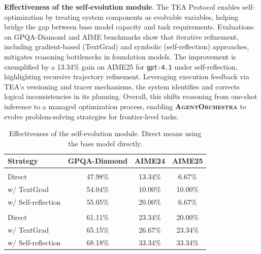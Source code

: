 \documentclass[11pt]{article}
\newcommand{\projectname}{\textbf{\textsc{AgentOrchestra}}\xspace}
\begin{document}
\textbf{Effectiveness of the self-evolution module}. The TEA Protocol enables self-optimization by treating system components as evolvable variables, helping bridge the gap between base model capacity and task requirements. Evaluations on GPQA-Diamond and AIME benchmarks show that iterative refinement, including gradient-based (TextGrad) and symbolic (self-reflection) approaches, mitigates reasoning bottlenecks in foundation models. The improvement is exemplified by a 13.34\% gain on AIME25 for \texttt{gpt-4.1} under self-reflection, highlighting recursive trajectory refinement. Leveraging execution feedback via TEA's versioning and tracer mechanisms, the system identifies and corrects logical inconsistencies in its planning. Overall, this shifts reasoning from one-shot inference to a managed optimization process, enabling \projectname to evolve problem-solving strategies for frontier-level tasks.

\begin{table}[htbp]
  \vspace{-0.2cm}
  \centering
  \caption{Effectiveness of the self-evolution module. Direct means using the base model directly.}
  \label{tab:effectiveness_of_self_evolution_module}
  \footnotesize
  \vspace{-0.2cm}
  \renewcommand{\arraystretch}{0.9}
  \setlength{\tabcolsep}{4pt}
  \begin{tabular}{lccc}
    \toprule
    \textbf{Strategy} & \textbf{GPQA-Diamond} & \textbf{AIME24} & \textbf{AIME25} \\
    \midrule
    \rowcolor{gray!15}
    \multicolumn{4}{c}{\textit{Base Model: gpt-4o}} \\
    Direct & 47.98\% & 13.34\% & 6.67\% \\
     w/ TextGrad & 54.04\% & 10.00\% & 10.00\% \\
     w/ Self-reflection & 55.05\% & 20.00\% & 6.67\% \\
    \midrule
    \rowcolor{gray!15}
    \multicolumn{4}{c}{\textit{Base Model: gpt-4.1}} \\
    Direct & 61.11\% & 23.34\% & 20.00\% \\
    w/ TextGrad & 65.15\% & 26.67\% & 23.34\% \\
    w/ Self-reflection & 68.18\% & 33.34\% & 33.34\% \\
    \bottomrule
  \end{tabular}
  \vspace{-0.5cm}
\end{table}
\end{document}
